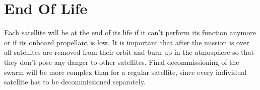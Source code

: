 \section{End Of Life}
\label{blSSEOL}

Each satellite will be at the end of its life if it can't perform its function anymore or if its onboard propellant is low.
It is important that after the mission is over all satellites are removed from their orbit and burn up in the atmosphere so that they don't pose any danger to other satellites.
Final decommissioning of the swarm will be more complex than for a regular satellite, since every individual satellite has to be decommissioned separately.